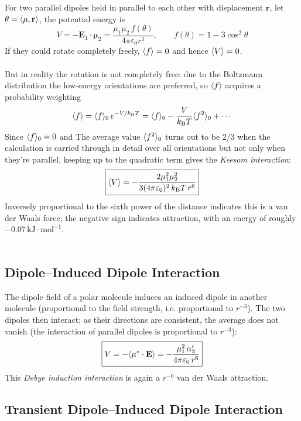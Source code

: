 %
		For two parallel dipoles held in parallel to each other with displacement $\mathbf{r}$, let $\theta=\langle \mu,\mathbf{r} \rangle$, 
		the potential energy is
		\[V = -\mathbf{E}_1\cdot\mathbf{\mu}_2 = \frac{\mu_1\mu_2\,f(\theta)}{4\pi\varepsilon_0 r^{3}}, \qquad f(\theta) = 1 - 3\cos^{2}\theta\]
		If they could rotate completely freely, $\langle f \rangle = 0$ and hence $\langle V \rangle = 0$. \\ \\
		But in reality the rotation is not completely free: due to the Boltzmann distribution the low-energy orientations are preferred, so $\langle f \rangle$ acquires a probability weighting
		\[\langle f \rangle = \langle f \rangle_0\,e^{-V/k_{\text{B}}T} = \langle f \rangle_0 - \frac{V}{k_{\text{B}}T}\langle f^{2} \rangle_0 + \cdots\]
		Since $\langle f \rangle_0 = 0$ and The average value $\langle f^2 \rangle_0$ turns out to be 2/3 when the calculation is carried through in
detail over all orientations but not only when they're parallel, keeping up to the quadratic term gives the \emph{Keesom interaction}:
		\[\boxed{\langle V \rangle = -\frac{2\mu_1^{2}\mu_2^{2}}{3(4\pi\varepsilon_0)^{2}\,k_{\text{B}}T\,r^{6}}}\]
		Inversely proportional to the sixth power of the distance indicates this is a van der Waals force; the negative sign indicates attraction, with an energy of roughly $-0.07\,\text{kJ}\cdot\text{mol}^{-1}$. \\\ \\

	\subsection{Dipole--Induced Dipole Interaction}

		The dipole field of a polar molecule induces an induced dipole in another molecule (proportional to the field strength, i.e. proportional to $r^{-3}$). 
		The two dipoles then interact; as their directions are consistent, the average does not vanish (the interaction of parallel dipoles is proportional to $r^{-3}$):
		\[\boxed{V = -\langle \mathbf{\mu}^{*}\cdot\mathbf{E} \rangle = -\frac{\mu_1^{2}\,\alpha_2'}{4\pi\varepsilon_0\,r^{6}}}\]
		This \emph{Debye induction interaction} is again a $r^{-6}$ van der Waals attraction.

	\subsection{Transient Dipole--Induced Dipole Interaction}

